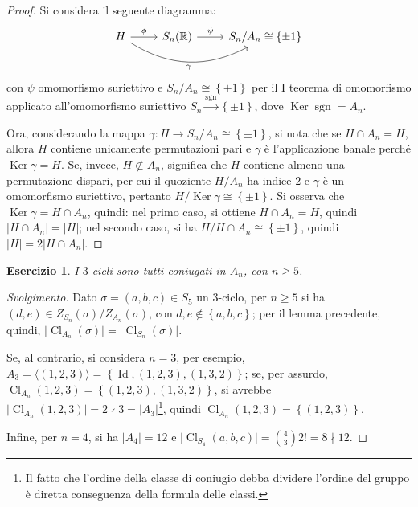 \documentclass[12pt]{scrartcl}
\theoremstyle{style}
\newtheorem{esercizio}{Esercizio}[section]
\newenvironment{svolgimento}{\renewcommand\qedsymbol{$\blacksquare$}\begin{proof}[Svolgimento]}{\end{proof}}
\numberwithin{equation}{subsection}
\begin{document}
	\begin{proof}
		Si considera il seguente diagramma:
	\[
\begin{tikzcd}
H \arrow[r, "\phi "] 
    \arrow[rr, bend right=30, "{\gamma}"'] & 
S_n(\mathbb{R}) \arrow[r, "\psi  "] & S_n / A_n \cong \left\{ \pm 1 \right\} 
\end{tikzcd}
\]
con $\psi  $ omomorfismo suriettivo e $S_n / A_n \cong \left\{ \pm 1 \right\} $ per il I teorema di omomorfismo applicato all'omomorfismo suriettivo $S_n \stackrel{\operatorname{sgn} }{\longrightarrow} \left\{ \pm 1 \right\} $, dove $\operatorname{Ker} \operatorname{sgn}  = A_n$. 

Ora, considerando la mappa $\gamma : H \to S_n / A_n \cong \left\{ \pm 1 \right\} $, si nota che se $H\cap A_n = H$, allora $H$ contiene unicamente permutazioni pari e $\gamma$ \`e l'applicazione banale perch\'e $\operatorname{Ker} \gamma = H$.
Se, invece, $H \not\subset A_n$, significa che $H$ contiene almeno una permutazione dispari, per cui il quoziente $H / A_n$ ha indice $2$ e $\gamma$ \`e un omomorfismo suriettivo, pertanto $H / \operatorname{Ker} \gamma \cong \left\{ \pm 1 \right\} $.
Si osserva che $\operatorname{Ker} \gamma = H \cap A_n$, quindi: nel primo caso, si ottiene $H\cap A_n= H$, quindi $\lvert H\cap A_n \rvert = \lvert H \rvert $; nel secondo caso, si ha $H / H\cap A_n \cong \left\{ \pm 1 \right\} $, quindi $\lvert H \rvert = 2 \lvert H \cap A_n \rvert $.
	\end{proof}
\begin{esercizio}
I $3$-cicli sono tutti coniugati in $A_n$, con $n\ge 5$.
\end{esercizio}
\begin{svolgimento}
	Dato $\sigma =(a,b,c) \in S_5$ un $3$-ciclo, per $n\ge 5$ si ha $(d,e) \in Z_{S_n} (\sigma ) / Z_{A_n} (\sigma )$, con $d,e \not \in \left\{ a,b,c \right\} $; per il lemma precedente, quindi, $\lvert \operatorname{Cl} _{A_n} (\sigma ) \rvert = \lvert \operatorname{Cl} _{S_n} (\sigma  )\rvert $.

	Se, al contrario, si considera $n=3$, per esempio, $A_3 = \langle (1,2,3) \rangle=\left\{ \operatorname{Id} , (1,2,3), (1,3,2) \right\} $; se, per assurdo, $\operatorname{Cl} _{A_n} (1,2,3) = \left\{ (1,2,3),(1,3,2) \right\} $, si avrebbe $\lvert \operatorname{Cl} _{A_n} (1,2,3) \rvert = 2 \nmid 3 = \lvert A_3 \rvert $\footnote{Il fatto che l'ordine della classe di coniugio debba dividere l'ordine del gruppo \`e diretta conseguenza della formula delle classi.}, quindi $\operatorname{Cl} _{A_n} (1,2,3) = \left\{ (1,2,3) \right\} $.

	Infine, per $n=4$, si ha $\lvert A_4 \rvert =12$ e $\lvert \operatorname{Cl} _{S_4} (a,b,c) \rvert = \binom{4}{3}2! = 8  \nmid  12$.
\end{svolgimento}
\end{document}
